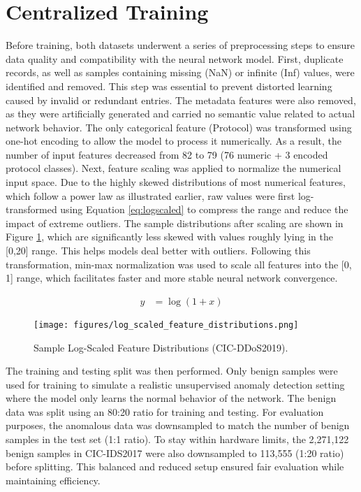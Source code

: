\section{Centralized Training}

Before training, both datasets underwent a series of preprocessing steps to ensure data quality and compatibility with the neural network model. First, duplicate records, as well as samples containing missing (NaN) or infinite (Inf) values, were identified and removed. This step was essential to prevent distorted learning caused by invalid or redundant entries. The metadata features were also removed, as they were artificially generated and carried no semantic value related to actual network behavior. The only categorical feature (Protocol) was transformed using one-hot encoding to allow the model to process it numerically. As a result, the number of input features decreased from 82 to 79 (76 numeric + 3 encoded protocol classes). Next, feature scaling was applied to normalize the numerical input space. Due to the highly skewed distributions of most numerical features, which follow a power law as illustrated earlier, raw values were first log-transformed using Equation \ref{eq:logscaled} to compress the range and reduce the impact of extreme outliers. The sample distributions after scaling are shown in Figure \ref{fig:log_scaled_feature_distribution}, which are significantly less skewed with values roughly lying in the [0,20] range. This helps models deal better with outliers. Following this transformation, min-max normalization was used to scale all features into the [0, 1] range, which facilitates faster and more stable neural network convergence.

\begin{align} \label{eq:logscaled}
y &= \log(1 + x)
\end{align}


\begin{figure}[h]
    \centering
    \texttt{[image: figures/log\_scaled\_feature\_distributions.png]}
    \caption{Sample Log-Scaled Feature Distributions (CIC-DDoS2019).}
    \label{fig:log_scaled_feature_distribution}
\end{figure}

The training and testing split was then performed. Only benign samples were used for training to simulate a realistic unsupervised anomaly detection setting where the model only learns the normal behavior of the network. The benign data was split using an 80:20 ratio for training and testing. For evaluation purposes, the anomalous data was downsampled to match the number of benign samples in the test set (1:1 ratio). To stay within hardware limits, the 2,271,122 benign samples in CIC-IDS2017 were also downsampled to 113,555 (1:20 ratio) before splitting. This balanced and reduced setup ensured fair evaluation while maintaining efficiency.

